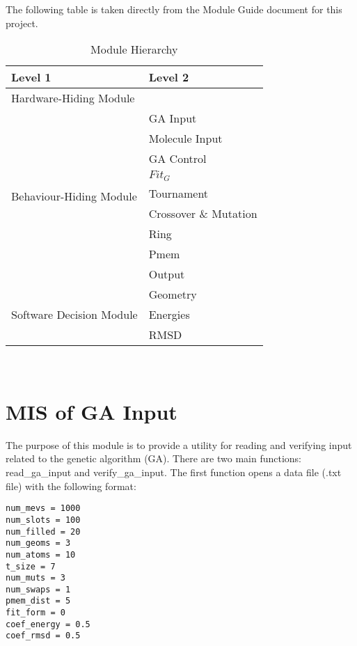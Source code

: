 \documentclass[12pt, titlepage]{article}
\begin{document}
The following table is taken directly from the Module Guide document for this project.

\begin{table}[h!]
	\centering
	\begin{tabular}{p{} p{}}
		\toprule
		\textbf{Level 1} & \textbf{Level 2}\\
		\midrule
		
		{Hardware-Hiding Module} & ~ \\
		\midrule
		
		\multirow{9}{0.3\textwidth}{Behaviour-Hiding Module}& GA Input \\
		& Molecule Input \\
		& GA Control\\
		& $Fit_G$ \\
		& Tournament \\
		& Crossover \& Mutation \\
		& Ring \\
		& Pmem \\
		& Output \\
		
		\midrule
		
		\multirow{3}{0.3\textwidth}{Software Decision Module} & Geometry \\
		& Energies \\
		& RMSD \\
		\bottomrule
		
	\end{tabular}
	\caption{Module Hierarchy}
	\label{TblMH}
\end{table}

\newpage
~\newpage

\section{MIS of GA Input} \label{section-ga_input}


The purpose of this module is to provide a utility for reading and verifying 
input related to the genetic algorithm (GA). There are two main functions: 
read\_ga\_input and verify\_ga\_input. The first function opens a data file 
(.txt file) with the following format:

\begin{lstlisting}
num_mevs = 1000
num_slots = 100
num_filled = 20
num_geoms = 3
num_atoms = 10
t_size = 7
num_muts = 3
num_swaps = 1
pmem_dist = 5
fit_form = 0
coef_energy = 0.5
coef_rmsd = 0.5
\end{lstlisting}
\end{document}
